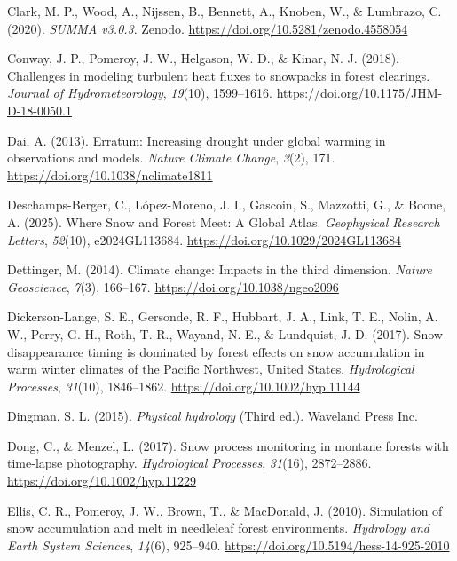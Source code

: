 \documentclass[
  letterpaper,
]{tex/uofsthesis-cs}
\newlength{\cslhangindent}
\newenvironment{CSLReferences}[2] %
 {\begin{list}{}{%
  \setlength{\itemindent}{0pt}
  \setlength{\leftmargin}{0pt}
  \setlength{\parsep}{0pt}
  \ifodd #1
   \setlength{\leftmargin}{\cslhangindent}
   \setlength{\itemindent}{-1\cslhangindent}
  \fi
  \setlength{\itemsep}{#2\baselineskip}}}
 {\end{list}}
\begin{document}
\begin{CSLReferences}{1}{0}
Clark, M. P., Wood, A., Nijssen, B., Bennett, A., Knoben, W., \&
Lumbrazo, C. (2020). \emph{{SUMMA} v3.0.3}. Zenodo.
\url{https://doi.org/10.5281/zenodo.4558054}

Conway, J. P., Pomeroy, J. W., Helgason, W. D., \& Kinar, N. J. (2018).
Challenges in modeling turbulent heat fluxes to snowpacks in forest
clearings. \emph{Journal of Hydrometeorology}, \emph{19}(10),
1599--1616. \url{https://doi.org/10.1175/JHM-D-18-0050.1}

Dai, A. (2013). Erratum: {Increasing} drought under global warming in
observations and models. \emph{Nature Climate Change}, \emph{3}(2), 171.
\url{https://doi.org/10.1038/nclimate1811}

Deschamps-Berger, C., López-Moreno, J. I., Gascoin, S., Mazzotti, G., \&
Boone, A. (2025). Where {Snow} and {Forest Meet}: {A Global Atlas}.
\emph{Geophysical Research Letters}, \emph{52}(10), e2024GL113684.
\url{https://doi.org/10.1029/2024GL113684}

Dettinger, M. (2014). Climate change: {Impacts} in the third dimension.
\emph{Nature Geoscience}, \emph{7}(3), 166--167.
\url{https://doi.org/10.1038/ngeo2096}

Dickerson-Lange, S. E., Gersonde, R. F., Hubbart, J. A., Link, T. E.,
Nolin, A. W., Perry, G. H., Roth, T. R., Wayand, N. E., \& Lundquist, J.
D. (2017). Snow disappearance timing is dominated by forest effects on
snow accumulation in warm winter climates of the {Pacific Northwest},
{United States}. \emph{Hydrological Processes}, \emph{31}(10),
1846--1862. \url{https://doi.org/10.1002/hyp.11144}

Dingman, S. L. (2015). \emph{Physical hydrology} (Third ed.). Waveland
Press Inc.

Dong, C., \& Menzel, L. (2017). Snow process monitoring in montane
forests with time-lapse photography. \emph{Hydrological Processes},
\emph{31}(16), 2872--2886. \url{https://doi.org/10.1002/hyp.11229}

Ellis, C. R., Pomeroy, J. W., Brown, T., \& MacDonald, J. (2010).
Simulation of snow accumulation and melt in needleleaf forest
environments. \emph{Hydrology and Earth System Sciences}, \emph{14}(6),
925--940. \url{https://doi.org/10.5194/hess-14-925-2010}


\end{CSLReferences}
\end{document}
